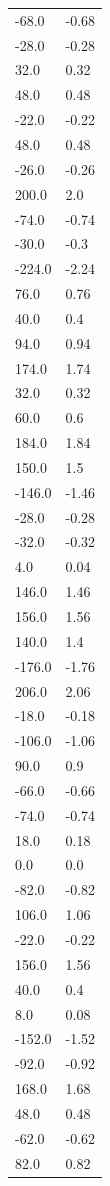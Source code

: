 \begin{longtable}{ll}
-68.0 & -0.68 \\
-28.0 & -0.28 \\
32.0 & 0.32 \\
48.0 & 0.48 \\
-22.0 & -0.22 \\
48.0 & 0.48 \\
-26.0 & -0.26 \\
200.0 & 2.0 \\
-74.0 & -0.74 \\
-30.0 & -0.3 \\
-224.0 & -2.24 \\
76.0 & 0.76 \\
40.0 & 0.4 \\
94.0 & 0.94 \\
174.0 & 1.74 \\
32.0 & 0.32 \\
60.0 & 0.6 \\
184.0 & 1.84 \\
150.0 & 1.5 \\
-146.0 & -1.46 \\
-28.0 & -0.28 \\
-32.0 & -0.32 \\
4.0 & 0.04 \\
146.0 & 1.46 \\
156.0 & 1.56 \\
140.0 & 1.4 \\
-176.0 & -1.76 \\
206.0 & 2.06 \\
-18.0 & -0.18 \\
-106.0 & -1.06 \\
90.0 & 0.9 \\
-66.0 & -0.66 \\
-74.0 & -0.74 \\
18.0 & 0.18 \\
0.0 & 0.0 \\
-82.0 & -0.82 \\
106.0 & 1.06 \\
-22.0 & -0.22 \\
156.0 & 1.56 \\
40.0 & 0.4 \\
8.0 & 0.08 \\
-152.0 & -1.52 \\
-92.0 & -0.92 \\
168.0 & 1.68 \\
48.0 & 0.48 \\
-62.0 & -0.62 \\
82.0 & 0.82 \\

\end{longtable}
